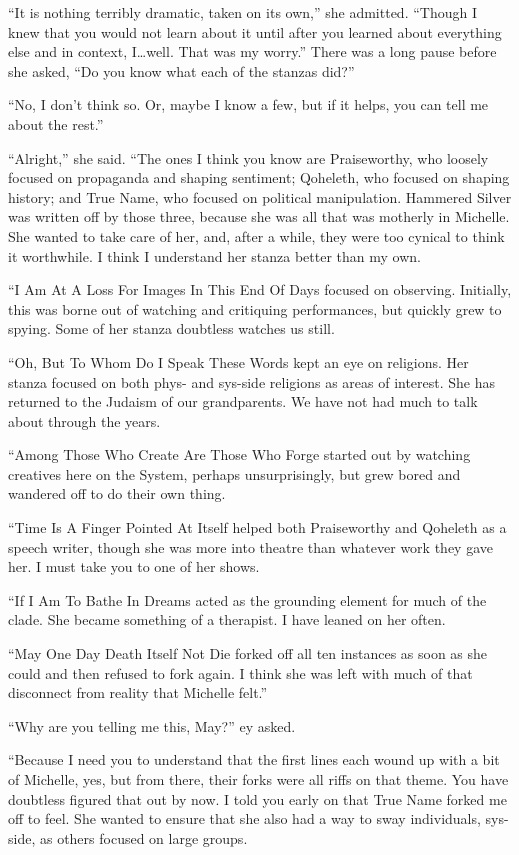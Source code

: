 ``It is nothing terribly dramatic, taken on its own,'' she admitted. ``Though I knew that you would not learn about it until after you learned about everything else and in context, I\ldots well. That was my worry.'' There was a long pause before she asked, ``Do you know what each of the stanzas did?''

``No, I don't think so. Or, maybe I know a few, but if it helps, you can tell me about the rest.''

``Alright,'' she said. ``The ones I think you know are Praiseworthy, who loosely focused on propaganda and shaping sentiment; Qoheleth, who focused on shaping history; and True Name, who focused on political manipulation. Hammered Silver was written off by those three, because she was all that was motherly in Michelle. She wanted to take care of her, and, after a while, they were too cynical to think it worthwhile. I think I understand her stanza better than my own.

``I Am At A Loss For Images In This End Of Days focused on observing. Initially, this was borne out of watching and critiquing performances, but quickly grew to spying. Some of her stanza doubtless watches us still.

``Oh, But To Whom Do I Speak These Words kept an eye on religions. Her stanza focused on both phys- and sys-side religions as areas of interest. She has returned to the Judaism of our grandparents. We have not had much to talk about through the years.

``Among Those Who Create Are Those Who Forge started out by watching creatives here on the System, perhaps unsurprisingly, but grew bored and wandered off to do their own thing.

``Time Is A Finger Pointed At Itself helped both Praiseworthy and Qoheleth as a speech writer, though she was more into theatre than whatever work they gave her. I must take you to one of her shows.

``If I Am To Bathe In Dreams acted as the grounding element for much of the clade. She became something of a therapist. I have leaned on her often.

``May One Day Death Itself Not Die forked off all ten instances as soon as she could and then refused to fork again. I think she was left with much of that disconnect from reality that Michelle felt.''

``Why are you telling me this, May?'' ey asked.

``Because I need you to understand that the first lines each wound up with a bit of Michelle, yes, but from there, their forks were all riffs on that theme. You have doubtless figured that out by now. I told you early on that True Name forked me off to feel. She wanted to ensure that she also had a way to sway individuals, sys-side, as others focused on large groups.


